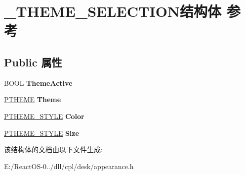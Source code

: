 \hypertarget{struct___t_h_e_m_e___s_e_l_e_c_t_i_o_n}{}\section{\+\_\+\+T\+H\+E\+M\+E\+\_\+\+S\+E\+L\+E\+C\+T\+I\+O\+N结构体 参考}
\label{struct___t_h_e_m_e___s_e_l_e_c_t_i_o_n}
\subsection*{Public 属性}
\begin{DoxyCompactItemize}
\item 
\mbox{\label{struct___t_h_e_m_e___s_e_l_e_c_t_i_o_n_a1f485b31ba37c7af2547e675c07dd208}} 
B\+O\+OL {\bfseries Theme\+Active}
\item 
\mbox{\label{struct___t_h_e_m_e___s_e_l_e_c_t_i_o_n_a60787a10a0f06f3250a00751cd8e67ed}} 
\hyperlink{struct___t_h_e_m_e}{P\+T\+H\+E\+ME} {\bfseries Theme}
\item 
\mbox{\label{struct___t_h_e_m_e___s_e_l_e_c_t_i_o_n_a1f7fad95ec51a0f17872951770ae2d05}} 
\hyperlink{struct___t_h_e_m_e___s_t_y_l_e}{P\+T\+H\+E\+M\+E\+\_\+\+S\+T\+Y\+LE} {\bfseries Color}
\item 
\mbox{\label{struct___t_h_e_m_e___s_e_l_e_c_t_i_o_n_a69681f1a782d98aa6e68ef909cb7c0c8}} 
\hyperlink{struct___t_h_e_m_e___s_t_y_l_e}{P\+T\+H\+E\+M\+E\+\_\+\+S\+T\+Y\+LE} {\bfseries Size}
\end{DoxyCompactItemize}


该结构体的文档由以下文件生成\+:\begin{DoxyCompactItemize}
\item 
E\+:/\+React\+O\+S-\/0../dll/cpl/desk/appearance.\+h\end{DoxyCompactItemize}

